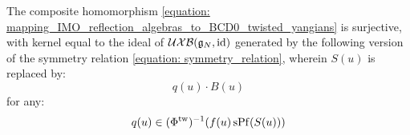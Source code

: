             \begin{corollary} \label{coro: IMO_reflection_algebras_vs_BCD0_twisted_yangians}
                The composite homomorphism \eqref{equation: mapping_IMO_reflection_algebras_to_BCD0_twisted_yangians} is surjective, with kernel equal to the ideal of $\mathcal{UXB}(\mathfrak{g}_N, \mathrm{id})$ generated by the following version of the symmetry relation \eqref{equation: symmetry_relation}, wherein $S(u)$ is replaced by:
                    $$q(u) \cdot B(u)$$
                for any:
                    $$q(u) \in (\Phi^{\mathrm{tw}})^{-1}( f(u) \operatorname{sPf}( S(u) ) )$$
            \end{corollary}
    
    \printbibliography

